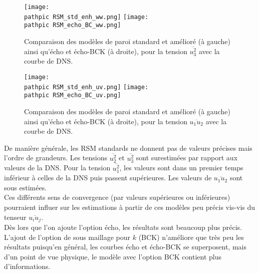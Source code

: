 \documentclass[a4paper,10pt]{article}
\newcommand\pathpic{/home/saura/Documents/Latex_files/Pic/}
\begin{document}
  \begin{figure}[ht!]
 \centering
 \texttt{[image: \\pathpic RSM\_std\_enh\_ww.png]} \hfill
 \texttt{[image: \\pathpic RSM\_echo\_BC\_ww.png]}
 \caption{Comparaison des modèles de paroi standard et amélioré (à gauche) ainsi qu'écho et écho-BCK (à droite), pour la tension $\overline{u_3^2}$ avec la courbe de DNS.}
 \label{ww}
 \end{figure}
 
\pagebreak 
 
 \begin{figure}[ht!]
 \centering
 \texttt{[image: \\pathpic RSM\_std\_enh\_uv.png]} \hfill
 \texttt{[image: \\pathpic RSM\_echo\_BC\_uv.png]}
 \caption{Comparaison des modèles de paroi standard et amélioré (à gauche) ainsi qu'écho et écho-BCK (à droite), pour la tension $\overline{u_1u_2}$ avec la courbe de DNS.}
 \label{uv}
 \end{figure}
 

\noindent De manière générale, les RSM standards ne donnent pas de valeurs précises mais l'ordre de grandeurs. Les tensions $\overline{u_2^2}$ et $\overline{u_3^2}$ sont surestimées par rapport aux valeurs de la DNS. Pour la tension $\overline{u_1^2}$, les valeurs sont dans un premier temps inférieur à celles de la DNS puis passent supérieures. Les valeurs de $\overline{u_1u_2}$ sont sous estimées. \\
Ces différents sens de convergence (par valeurs supérieures ou inférieures) pourraient influer sur les estimations à partir de ces modèles peu précis vis-vis du tenseur $\overline{u_iu_j}$.\\

Dès lors que l'on ajoute l'option écho, les résultats sont beaucoup plus précis. L'ajout de l'option de sous maillage pour $k$ (BCK) n'améliore que très peu les résultats puisqu'en général, les courbes écho et écho-BCK se superposent, mais d'un point de vue physique, le modèle avec l'option BCK contient plus d'informations. \\
\end{document}
